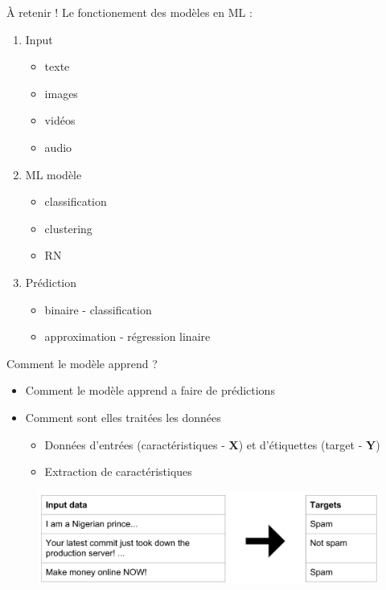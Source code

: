 \documentclass[aspectratio=169,xcolor=dvipsnames, t]{beamer}
\begin{document}
\begin{frame}{À retenir !}
	Le fonctionement des modèles en ML :
	\begin{enumerate}
		\item Input
		\begin{itemize}
			\item texte
			\item images
			\item vidéos
			\item audio
		\end{itemize}
		\item ML modèle
		\begin{itemize}
			\item classification
			\item clustering 
			\item RN
		\end{itemize}
		\item Prédiction 
		\begin{itemize}
			\item binaire - classification
			\item approximation - régression linaire
		\end{itemize}
	\end{enumerate}
\end{frame}
\begin{frame}{Comment le modèle apprend ?}
\begin{itemize}
	\item Comment le modèle apprend a faire de prédictions
	\item Comment sont elles traitées les données
	\begin{itemize}
		\item Données d'entrées (caractéristiques - \textbf{X}) et d'étiquettes (target - \textbf{Y})
		\item Extraction de caractéristiques 
	\end{itemize}
\end{itemize}

\begin{figure}
	\includegraphics[height=0.4\paperheight ]{figures/cm2_InputClassification.png}
\end{figure}
\end{frame}
\end{document}
